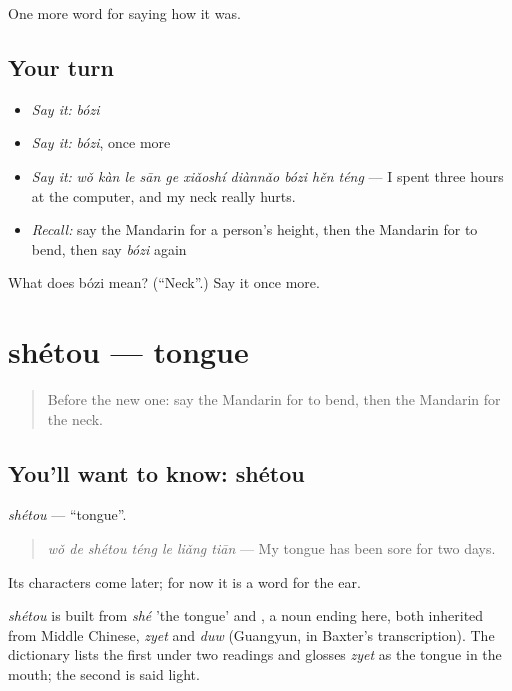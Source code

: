 \begin{grammarlens}[title={What you've built}]
One more word for saying how it was.
\end{grammarlens}

\subsection*{Your turn}
\begin{itemize}
\raggedright
  \item \emph{Say it:} \emph{bózi}
  \item \emph{Say it:} \emph{bózi}, once more
  \item \emph{Say it:} \emph{wǒ kàn le sān ge xiǎoshí diànnǎo bózi hěn téng} — I spent three hours at the computer, and my neck really hurts.
  \item \emph{Recall:} say the Mandarin for a person's height, then the Mandarin for to bend, then say \emph{bózi} again
\end{itemize}

\begin{tcolorbox}[breakable,colback=teal!4,colframe=teal!35!black,title={Before you move on}]
What does bózi mean? (\textquotedblleft{}Neck\textquotedblright{}.) Say it once more.
\end{tcolorbox}
\section[shétou]{shétou — tongue}

\label{lesson:ZH-C476-shetou}



\begin{quote}
Before the new one: say the Mandarin for to bend, then the Mandarin for the neck.
\end{quote}

\subsection*{You'll want to know: shétou}
\emph{shétou} — \textquotedblleft{}tongue\textquotedblright{}.

\begin{quote}
\emph{wǒ de shétou téng le liǎng tiān} — My tongue has been sore for two days.
\end{quote}

Its characters come later; for now it is a word for the ear.

\begin{cousinweb}
\emph{shétou} is built from \emph{shé} 'the tongue' and , a noun ending here, both inherited from Middle Chinese, \emph{zyet} and \emph{duw} (Guangyun, in Baxter's transcription). The dictionary lists the first under two readings and glosses \emph{zyet} as the tongue in the mouth; the second is said light.
\end{cousinweb}

